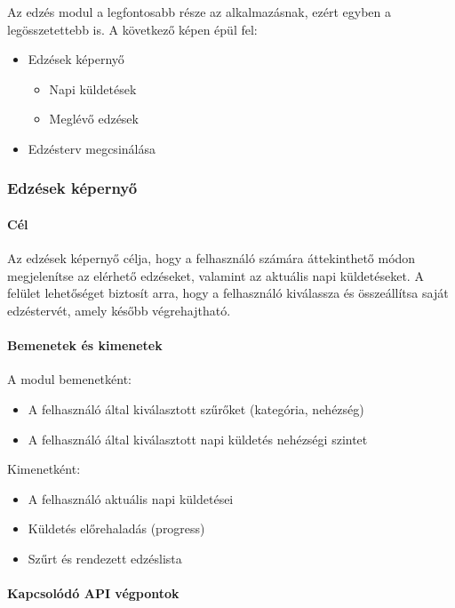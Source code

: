 \documentclass[
]{thesis-ekf}
\theoremstyle{definition}
\theoremstyle{remark}
\begin{document}
Az edzés modul a legfontosabb része az alkalmazásnak, ezért egyben a legösszetettebb is. A következő képen épül fel:
\begin{itemize}
    \item Edzések képernyő
    \begin{itemize}
        \item Napi küldetések
        \item Meglévő edzések
    \end{itemize}
    \item Edzésterv megcsinálása
\end{itemize}

\subsubsection{Edzések képernyő}

\paragraph{Cél}
Az edzések képernyő célja, hogy a felhasználó számára áttekinthető módon megjelenítse az elérhető edzéseket, valamint az aktuális napi küldetéseket. A felület lehetőséget biztosít arra, hogy a felhasználó kiválassza és összeállítsa saját edzéstervét, amely később végrehajtható.

\paragraph{Bemenetek és kimenetek}

A modul bemenetként:
\begin{itemize}
    \item A felhasználó által kiválasztott szűrőket (kategória, nehézség)
    \item A felhasználó által kiválasztott napi küldetés nehézségi szintet
\end{itemize}

Kimenetként:
\begin{itemize}
    \item A felhasználó aktuális napi küldetései
    \item Küldetés előrehaladás (progress)
    \item Szűrt és rendezett edzéslista
\end{itemize}

\paragraph{Kapcsolódó API végpontok}
\end{document}

